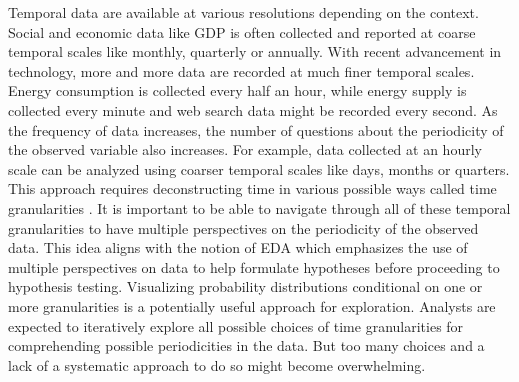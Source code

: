 \documentclass[12pt]{article}
\begin{document}
Temporal data are available at various resolutions depending on the context. Social and economic data like GDP is often collected and reported at coarse temporal scales like monthly, quarterly or annually. With recent advancement in technology, more and more data are recorded at much finer temporal scales. Energy consumption is collected every half an hour, while energy supply is collected every minute and web search data might be recorded every second. As the frequency of data increases, the number of questions about the periodicity of the observed variable also increases. For example, data collected at an hourly scale can be analyzed using coarser temporal scales like days, months or quarters. This approach requires deconstructing time in various possible ways called time granularities \citep{aigner2011visualization}.
It is important to be able to navigate through all of these temporal granularities to have multiple perspectives on the periodicity of the observed data. This idea aligns with the notion of EDA \citep{Tukey1977-jx} which emphasizes the use of multiple perspectives on data to help formulate hypotheses before proceeding to hypothesis testing. Visualizing probability distributions conditional on one or more granularities is a potentially useful approach for exploration. Analysts are expected to iteratively explore all possible choices of time granularities for comprehending possible periodicities in the data. But too many choices and a lack of a systematic approach to do so might become overwhelming.
\end{document}
